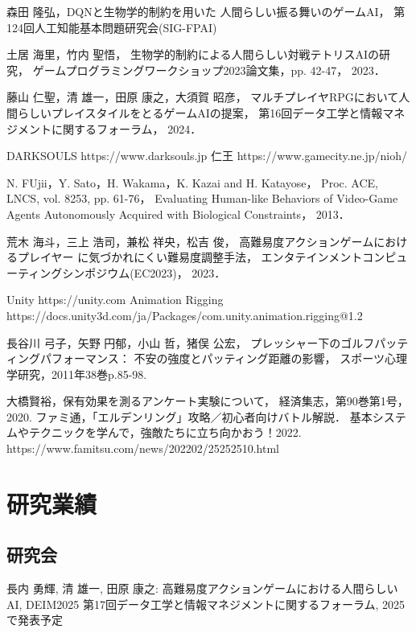 \documentclass[a4paper,12pt,oneside,openany,titlepage]{jreport}
\renewcommand{\bibname}{参考文献}
\begin{document}
\addcontentsline{toc}{chapter}{\bibname}
\begin{thebibliography}{99}
   森田 隆弘，DQNと生物学的制約を用いた
人間らしい振る舞いのゲームAI，
第124回人工知能基本問題研究会(SIG-FPAI)

  土居 海里，竹内 聖悟，
生物学的制約による人間らしい対戦テトリスAIの研究，
ゲームプログラミングワークショップ2023論文集，pp. 42-47，
2023．

 藤山 仁聖，清 雄一，田原 康之，大須賀 昭彦，
マルチプレイヤRPGにおいて人間らしいプレイスタイルをとるゲームAIの提案，
第16回データ工学と情報マネジメントに関するフォーラム，
2024．

 DARKSOULS https://www.darksouls.jp
 仁王 https://www.gamecity.ne.jp/nioh/

 N. FUjii，Y. Sato，H. Wakama，K. Kazai and H. Katayose，
Proc. ACE, LNCS, vol. 8253, pp. 61-76，
Evaluating Human-like Behaviors of Video-Game Agents Autonomously Acquired with Biological Constraints，
2013．

 荒木 海斗，三上 浩司，兼松 祥央，松吉 俊，
高難易度アクションゲームにおけるプレイヤー
に気づかれにくい難易度調整手法，
エンタテインメントコンピューティングシンポジウム(EC2023)，
2023．

 Unity https://unity.com
 Animation Rigging\\
https://docs.unity3d.com/ja/Packages/com.unity.animation.rigging@1.2

 長谷川 弓子，矢野 円郁，小山 哲，猪俣 公宏，
プレッシャー下のゴルフパッティングパフォーマンス：
不安の強度とパッティング距離の影響，
スポーツ心理学研究，2011年38巻p.85-98.

大橋賢裕，保有効果を測るアンケート実験について，
経済集志，第90巻第1号，2020.
ファミ通，「エルデンリング」攻略／初心者向けバトル解説．
基本システムやテクニックを学んで，強敵たちに立ち向かおう！2022.
https://www.famitsu.com/news/202202/25252510.html

\end{thebibliography}

\newpage

\chapter*{研究業績}
\thispagestyle{plain}
\lhead{\leftmark}
\rhead{\thepage}
\renewcommand{\headrulewidth}{1pt}
 \section*{研究会}
 長内 勇輝, 清 雄一, 田原 康之: 
 高難易度アクションゲームにおける人間らしいAI,  
 DEIM2025 第17回データ工学と情報マネジメントに関するフォーラム,
2025で発表予定

\newpage
\end{document}

